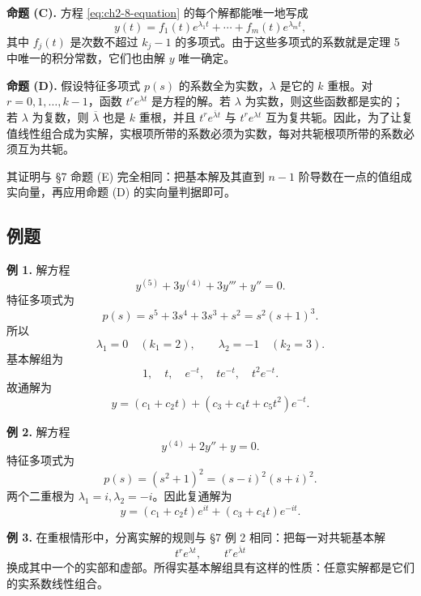 \medskip
\noindent\textbf{命题 (C).}
方程 \eqref{eq:ch2-8-equation} 的每个解都能唯一地写成
\begin{equation}
 y(t)=f_1(t)e^{\lambda_1t}+\cdots+f_m(t)e^{\lambda_mt},
 \label{eq:ch2-8-polynomial-exponential-form}
\end{equation}
其中 \(f_j(t)\) 是次数不超过 \(k_j-1\) 的多项式。由于这些多项式的系数就是定理 5 中唯一的积分常数，它们也由解 \(y\) 唯一确定。

\medskip
\noindent\textbf{命题 (D).}
假设特征多项式 \(p(s)\) 的系数全为实数，\(\lambda\) 是它的 \(k\) 重根。对
\(r=0,1,\ldots,k-1\)，函数 \(t^re^{\lambda t}\) 是方程的解。若 \(\lambda\) 为实数，则这些函数都是实的；若 \(\lambda\) 为复数，则 \(\overline\lambda\) 也是 \(k\) 重根，并且 \(t^re^{\overline\lambda t}\) 与 \(t^re^{\lambda t}\) 互为复共轭。因此，为了让复值线性组合成为实解，实根项所带的系数必须为实数，每对共轭根项所带的系数必须互为共轭。

其证明与 §7 命题 (E) 完全相同：把基本解及其直到 \(n-1\) 阶导数在一点的值组成实向量，再应用命题 (D) 的实向量判据即可。

\subsection*{例题}

\noindent\textbf{例 1.}
解方程
\begin{equation}
 y^{(5)}+3y^{(4)}+3y'''+y''=0.
 \label{eq:ch2-8-example1}
\end{equation}
特征多项式为
\[
 p(s)=s^5+3s^4+3s^3+s^2=s^2(s+1)^3.
\]
所以
\[
 \lambda_1=0\quad(k_1=2),
 \qquad
 \lambda_2=-1\quad(k_2=3).
\]
基本解组为
\[
 1,\quad t,\quad e^{-t},\quad te^{-t},\quad t^2e^{-t}.
\]
故通解为
\begin{equation}
 y=(c_1+c_2t)+(c_3+c_4t+c_5t^2)e^{-t}.
 \label{eq:ch2-8-example1-general}
\end{equation}

\noindent\textbf{例 2.}
解方程
\begin{equation}
 y^{(4)}+2y''+y=0.
 \label{eq:ch2-8-example2}
\end{equation}
特征多项式为
\[
 p(s)=(s^2+1)^2=(s-i)^2(s+i)^2.
\]
两个二重根为 \(\lambda_1=i,\lambda_2=-i\)。因此复通解为
\begin{equation}
 y=(c_1+c_2t)e^{it}+(c_3+c_4t)e^{-it}.
 \label{eq:ch2-8-example2-general}
\end{equation}

\noindent\textbf{例 3.}
在重根情形中，分离实解的规则与 §7 例 2 相同：把每一对共轭基本解
\[
 t^re^{\lambda t},\qquad t^re^{\overline\lambda t}
\]
换成其中一个的实部和虚部。所得实基本解组具有这样的性质：任意实解都是它们的实系数线性组合。

